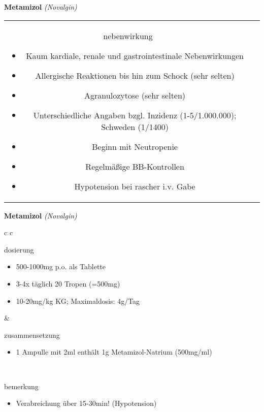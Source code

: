 \documentclass[12pt]{beamer}
\begin{document}
\begin{frame}{
    \textbf{Metamizol}
    \textit{(Novalgin)}
}
\begin{tabular}{c c}
\begin{beamercolorbox}[wd=\boxwidth\textwidth,ht=\boxheight\textheight,sep=1em]{nebenwirkung}
            \tiny
            \begin{itemize}
                \item Kaum kardiale, renale und gastrointestinale Nebenwirkungen
                \item Allergische Reaktionen bis hin zum Schock (sehr selten)
                \item Agranulozytose (sehr selten)
                \item Unterschiedliche Angaben bzgl. Inzidenz (1-5/1.000.000); Schweden (1/1400)
                \item Beginn mit Neutropenie
                \item Regelmäßige BB-Kontrollen
                \item Hypotension bei rascher i.v. Gabe
            \end{itemize}
        \end{beamercolorbox} \\
    \end{tabular}
\end{frame}

\begin{frame}{
    \textbf{Metamizol}
    \textit{(Novalgin)}
}
    \begin{tabular}{c c}
        \begin{beamercolorbox}[wd=\boxwidth\textwidth,ht=\boxheight\textheight,sep=1em]{dosierung}
            \begin{itemize}
                \item 500-1000mg p.o. als Tablette 
                \item 3-4x täglich 20 Tropen (=500mg)
                \item 10-20mg/kg KG; Maximaldosis: 4g/Tag
            \end{itemize}
        \end{beamercolorbox} & 
        \begin{beamercolorbox}[wd=\boxwidth\textwidth,ht=\boxheight\textheight,sep=1em]{zusammensetzung}
            \begin{itemize}
                \item 1 Ampulle mit 2ml enthält 1g Metamizol-Natrium (500mg/ml)
            \end{itemize}
        \end{beamercolorbox} \\
        \begin{beamercolorbox}[wd=\textwidth,ht=\boxheight\textheight,sep=1em]{bemerkung}
            \begin{itemize}
                \item Verabreichung über 15-30min! (Hypotension)
            \end{itemize}
        \end{beamercolorbox} \\
    \end{tabular}
\end{frame}
\end{document}
